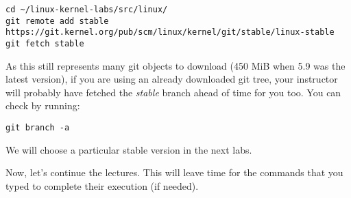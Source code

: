 {\footnotesize
\begin{verbatim}
cd ~/linux-kernel-labs/src/linux/
git remote add stable https://git.kernel.org/pub/scm/linux/kernel/git/stable/linux-stable
git fetch stable
\end{verbatim}
}

As this still represents many git objects to download (450 MiB when 5.9 was
the latest version), if you are using an already downloaded git tree,
your instructor will probably have fetched the {\em stable} branch ahead
of time for you too. You can check by running:

\begin{verbatim}
git branch -a
\end{verbatim}

We will choose a particular stable version in the next labs.

Now, let's continue the lectures. This will leave time for the commands
that you typed to complete their execution (if needed).
